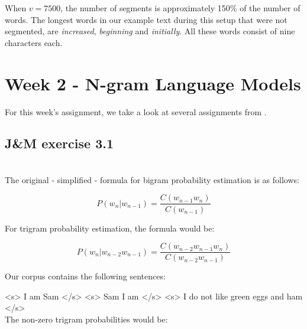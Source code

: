 \documentclass[a4paper, 11pt]{article}
\begin{document}
When $v=7500$, the number of segments is approximately 150\% of the number of words. The longest words in our example text during this setup that were not segmented, are \textit{increased}, \textit{beginning} and \textit{initially}. All these words consist of nine characters each.

\section{Week 2 - N-gram Language Models}

For this week's assignment, we take a look at several assignments from \citet{jurafskyspeech}.

\subsection{J\&M exercise 3.1}

\noindent{}\\


The original - simplified - formula for bigram probability estimation is as follows:

$$P(w_{n} | w_{n-1}) = \frac{C(w_{n-1}w_{n})}{C(w_{n-1})}$$

For trigram probability estimation, the formula would be:

$$P(w_{n} | w_{n-2} w_{n-1}) = \frac{C(w_{n-2} w_{n-1}w_{n})}{C(w_{n-2} w_{n-1})}$$

Our corpus contains the following sentences:

<s> I am Sam </s> \quad <s> Sam I am </s> \quad <s> I do not  like green eggs and ham </s>\\

The non-zero trigram probabilities would be:
\end{document}
